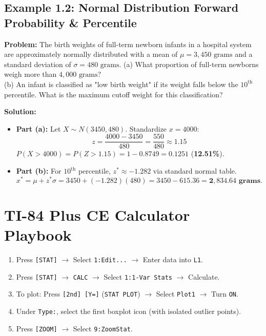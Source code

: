 \subsection*{Example 1.2: Normal Distribution Forward Probability \& Percentile}
\textbf{Problem:} The birth weights of full-term newborn infants in a hospital system are approximately normally distributed with a mean of $\mu = 3,450\text{ grams}$ and a standard deviation of $\sigma = 480\text{ grams}$.
(a) What proportion of full-term newborns weigh more than $4,000\text{ grams}$?\\
(b) An infant is classified as "low birth weight" if its weight falls below the $10^{\text{th}}$ percentile. What is the maximum cutoff weight for this classification?

\textbf{Solution:}
\begin{itemize}[leftmargin=1.2em]
  \item \textbf{Part (a):} Let $X \sim N(3450, 480)$. Standardize $x = 4000$:
  \[ z = \frac{4000 - 3450}{480} = \frac{550}{480} \approx 1.15 \]
  $P(X > 4000) = P(Z > 1.15) = 1 - 0.8749 = 0.1251$ (\textbf{12.51\%}).
  \item \textbf{Part (b):} For $10^{\text{th}}$ percentile, $z^* \approx -1.282$ via standard normal table.\\
  \[ x^* = \mu + z^*\sigma = 3450 + (-1.282)(480) = 3450 - 615.36 = \mathbf{2,834.64\text{ grams}}. \]
\end{itemize}

\section{TI-84 Plus CE Calculator Playbook}

\begin{calculatorbox}
\begin{enumerate}[leftmargin=1.2em]
  \item Press \texttt{[STAT]} $\rightarrow$ Select \texttt{1:Edit...} $\rightarrow$ Enter data into \texttt{L1}.
  \item Press \texttt{[STAT]} $\rightarrow$ \texttt{CALC} $\rightarrow$ Select \texttt{1:1-Var Stats} $\rightarrow$ Calculate.
  \item To plot: Press \texttt{[2nd] [Y=]} (\texttt{STAT PLOT}) $\rightarrow$ Select \texttt{Plot1} $\rightarrow$ Turn \texttt{ON}.
  \item Under \texttt{Type:}, select the first boxplot icon (with isolated outlier points).
  \item Press \texttt{[ZOOM]} $\rightarrow$ Select \texttt{9:ZoomStat}.
\end{enumerate}
\end{calculatorbox}


